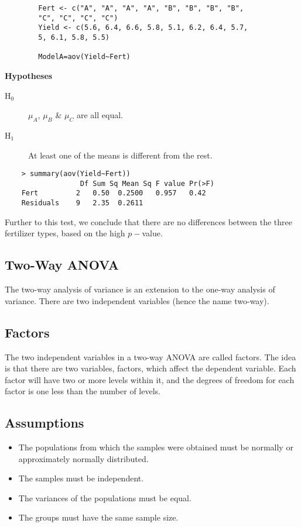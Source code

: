 \documentclass[12pt]{article}
\begin{document}
	\begin{framed}
		\begin{verbatim}
		Fert <- c("A", "A", "A", "A", "B", "B", "B", "B", 
		"C", "C", "C", "C")
		Yield <- c(5.6, 6.4, 6.6, 5.8, 5.1, 6.2, 6.4, 5.7, 
		5, 6.1, 5.8, 5.5)
		
		ModelA=aov(Yield~Fert)
		\end{verbatim}
	\end{framed}
	\noindent \textbf{Hypotheses}
	\begin{description}
		\item[H$_0$] $\mu_A$, $\mu_B$ \& $\mu_C$ are all equal.
		\item[H$_1$] At least one of the means is different from the rest.
	\end{description}	
	\begin{verbatim}
	> summary(aov(Yield~Fert))
	              Df Sum Sq Mean Sq F value Pr(>F)
	Fert         2   0.50  0.2500   0.957   0.42
	Residuals    9   2.35  0.2611 
	\end{verbatim}
	Further to this test, we conclude that there are no differences between the three fertilizer types, based on the high $p-$value.

\newpage
	

	

	

		
	\subsection*{Two-Way ANOVA}
	
	The two-way analysis of variance is an extension to the one-way analysis of variance. There are two independent variables (hence the name two-way).
	\subsection*{Factors}
	
	The two independent variables in a two-way ANOVA are called factors. The idea is that there are two variables, factors, which affect the dependent variable. Each factor will have two or more levels within it, and the degrees of freedom for each factor is one less than the number of levels.	
	\subsection*{Assumptions}
		\begin{itemize}
		\item The populations from which the samples were obtained must be normally or approximately normally distributed.
		\item The samples must be independent.
		\item The variances of the populations must be equal.
		\item The groups must have the same sample size.
	\end{itemize}
\end{document}
